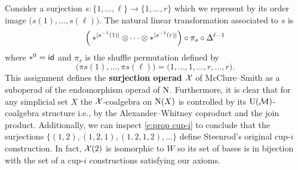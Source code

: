 Consider a surjection $s \colon \{1, \dots, \ell\} \to \{1, \dots, r\}$ which we represent by its order image $\big( s(1), \dots, s(\ell) \big)$.
The natural linear transformation associated to $s$ is
\begin{equation} \label{e:surjection action}
\Big( \ast^{\lvert s^{-1}(1)\rvert} \otimes \dotsb \otimes \ast^{\lvert s^{-1}(r)\rvert} \Big) \circ \pi_s \circ \Delta^{\ell-1}
\end{equation}
where $\ast^0 = \mathsf{id}$ and $\pi_s$ is the shuffle permutation defined by
\[
\big( \pi s(1), \dots, \pi s(\ell) \big) =
\big( 1, \dots, 1, \dots, r, \dots, r \big).
\]
This assignment defines the \textbf{surjection operad} $\mathcal{X}$ of McClure--Smith \cite{mcclure2003multivariable} as a suboperad of the endomorphism operad of $\operatorname{N}$.
Furthermore, it is clear that for any simplicial set $X$ the $\mathcal{X}$-coalgebra on $\operatorname{N}(X)$ is controlled by its ${\operatorname{U}(\mathcal{M})}$-coalgebra structure i.e., by the Alexander--Whitney coproduct and the join product.
Additionally, we can inspect \cref{e:prop cup-i} to conclude that the surjections $\big\{ (1,2), (1,2,1), (1,2,1,2), \dots \big\}$ define Steenrod's original \mbox{cup-$i$} construction.
In fact, $\mathcal{X}(2)$ is isomorphic to $W$ so its set of bases is in bijection with the set of a \mbox{cup-$i$} constructions satisfying our axioms.

\subsubsection{}

